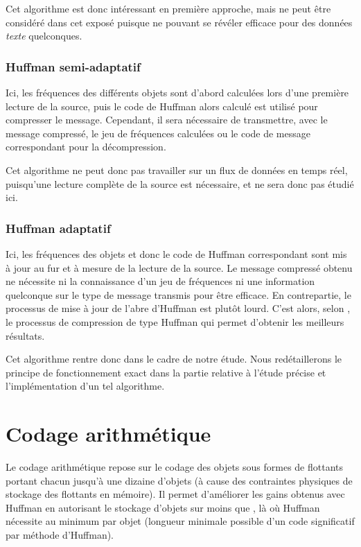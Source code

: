 \documentclass[a4paper, 11pt, twoside]{book}
\newcommand{\link}[1]{\sf{#1}}
\newcommand{\mes}[1]{\sf{#1}}
\begin{document}
    Cet algorithme est donc intéressant en première approche, mais ne peut être considéré dans cet exposé puisque ne pouvant se révéler efficace pour des données \emph{texte} quelconques.

    \subsubsection{Huffman semi-adaptatif}

    Ici, les fréquences des différents objets sont d'abord calculées lors d'une première lecture de la source, puis le code de Huffman alors calculé est utilisé pour compresser le message. Cependant, il sera nécessaire de transmettre, avec le message compressé, le jeu de fréquences calculées ou le code de message correspondant pour la décompression.

    Cet algorithme ne peut donc pas travailler sur un flux de données en temps réel, puisqu'une lecture complète de la source est nécessaire, et ne sera donc pas étudié ici.

    \subsubsection{Huffman adaptatif}

    Ici, les fréquences des objets et donc le code de Huffman correspondant sont mis à jour au fur et à mesure de la lecture de la source. Le message compressé obtenu ne nécessite ni la connaissance d'un jeu de fréquences ni une information quelconque sur le type de message transmis pour être efficace. En contrepartie, le processus de mise à jour de l'abre d'Huffman est plutôt lourd. C'est alors, selon \href{https://fr.wikipedia.org/wiki/Codage_de_Huffman}{\link{Wikipédia}}, le processus de compression de type Huffman qui permet d'obtenir les meilleurs résultats.

    Cet algorithme rentre donc dans le cadre de notre étude. Nous redétaillerons le principe de fonctionnement exact dans la partie relative à l'étude précise et l'implémentation d'un tel algorithme.

    \section{Codage arithmétique}

    Le codage arithmétique repose sur le codage des objets sous formes de flottants portant chacun jusqu'à une dizaine d'objets (à cause des contraintes physiques de stockage des flottants en mémoire). Il permet d'améliorer les gains obtenus avec Huffman en autorisant le stockage d'objets sur moins que \mes{1 bit}, là où Huffman nécessite au minimum \mes{1 bit} par objet (longueur minimale possible d'un code significatif par méthode d'Huffman).
\end{document}
